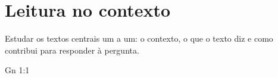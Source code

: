 \chapter{Leitura no contexto}

\begin{objetivo}
Estudar os textos centrais um a um: o contexto, o que o texto diz e como
contribui para responder à pergunta.
\end{objetivo}

\begin{fichatexto}{Gn 1:1}
\end{fichatexto}
